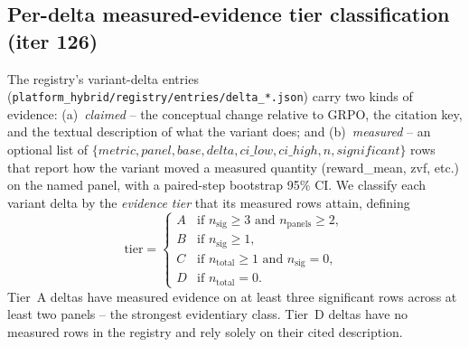 %
%

\subsection{Per-delta measured-evidence tier classification (iter 126)}
\label{sec:p6-iter126-evidence-tier}

The registry's variant-delta entries
(\texttt{platform_hybrid/registry/entries/delta\_*.json}) carry two kinds of evidence:
(a)~\emph{claimed} -- the conceptual change relative to GRPO, the citation
key, and the textual description of what the variant does; and
(b)~\emph{measured} -- an optional list of $\{metric, panel, base, delta,
ci\_low, ci\_high, n, significant\}$ rows that report how the variant moved
a measured quantity (reward\_mean, zvf, etc.) on the named panel, with a
paired-step bootstrap 95\% CI.  We classify each variant delta by the
\emph{evidence tier} that its measured rows attain, defining
\[
\text{tier} = \begin{cases}
A & \text{if } n_{\text{sig}} \geq 3 \text{ and } n_{\text{panels}} \geq 2,\\
B & \text{if } n_{\text{sig}} \geq 1,\\
C & \text{if } n_{\text{total}} \geq 1 \text{ and } n_{\text{sig}} = 0,\\
D & \text{if } n_{\text{total}} = 0.
\end{cases}
\]
Tier~A deltas have measured evidence on at least three significant rows
across at least two panels -- the strongest evidentiary class.
Tier~D deltas have no measured rows in the registry and rely solely on
their cited description.

